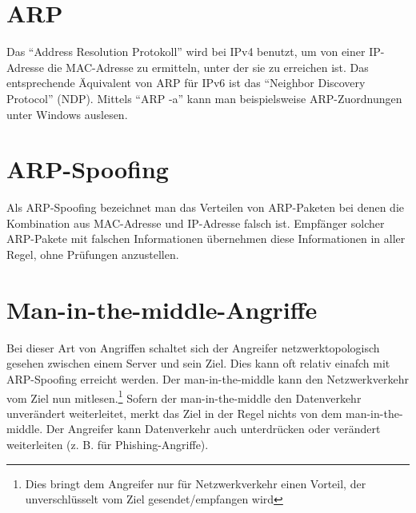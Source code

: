 \section{ARP}
Das \enquote{Address Resolution Protokoll} wird bei IPv4 benutzt, um von einer IP-Adresse die MAC-Adresse zu ermitteln, unter der sie zu erreichen ist. Das entsprechende Äquivalent von ARP für IPv6 ist das \enquote{Neighbor Discovery Protocol} (NDP). Mittels \enquote{ARP -a} kann man beispielsweise ARP-Zuordnungen unter Windows auslesen.
\section{ARP-Spoofing}
Als ARP-Spoofing bezeichnet man das Verteilen von ARP-Paketen bei denen die Kombination aus MAC-Adresse und IP-Adresse falsch ist. Empfänger solcher ARP-Pakete mit falschen Informationen übernehmen diese Informationen in aller Regel, ohne Prüfungen anzustellen.
\section{Man-in-the-middle-Angriffe}
Bei dieser Art von Angriffen schaltet sich der Angreifer netzwerktopologisch gesehen zwischen einem Server und sein Ziel. Dies kann oft relativ einafch mit ARP-Spoofing erreicht werden. Der man-in-the-middle kann den Netzwerkverkehr vom Ziel nun mitlesen.\footnote{Dies bringt dem Angreifer nur für Netzwerkverkehr einen Vorteil, der unverschlüsselt vom Ziel gesendet/empfangen wird} Sofern der man-in-the-middle den Datenverkehr unverändert weiterleitet, merkt das Ziel in der Regel nichts von dem man-in-the-middle. Der Angreifer kann Datenverkehr auch unterdrücken oder verändert weiterleiten (z. B. für Phishing-Angriffe).
